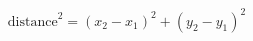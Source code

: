 \documentclass[preview]{standalone}
\begin{document}
\begin{align*}
\text{distance}^2 = (x_2-x_1)^2 + (y_2-y_1)^2
\end{align*}
\end{document}
